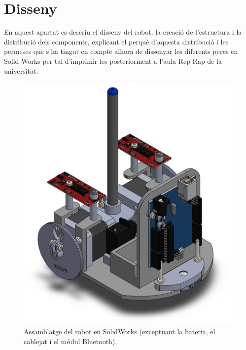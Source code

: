 \setlength\topmargin{8mm}
\onehalfspacing
\chapter{Disseny} %

\label{Chapter3} %


En aquest apartat es descriu el disseny del robot, la creació de l’estructura i la distribució dels components, explicant el perquè d’aquesta distribució i les permeses que s’ha tingut en compte alhora de dissenyar les diferents peces en Solid Works per tal d'imprimir-les posteriorment a l'aula Rep Rap de la universitat.   

\begin{figure}[H]
	\centering
	\includegraphics[scale=0.6]{RobotSW.png}
	\caption{Assamblatge del robot en SolidWorks (exceptuant la bateria, el cablejat i el módul Bluetooth).}
	\label{fig:RobotSW}
\end{figure}

